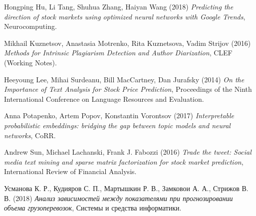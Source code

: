 \documentclass[12pt, twoside]{article}
\begin{document}
\begin{thebibliography}{9}
Hongping Hu, Li Tang, Shuhua Zhang, Haiyan Wang (2018) \emph{Predicting the direction of stock markets using optimized neural networks with Google Trends}, Neurocomputing.

Mikhail Kuznetsov, Anastasia Motrenko, Rita Kuznetsova, Vadim Strijov (2016) \emph{Methods for Intrinsic Plagiarism Detection and Author Diarization}, CLEF (Working Notes).

Heeyoung Lee, Mihai Surdeanu, Bill MacCartney, Dan Jurafsky (2014) \emph{On the Importance of Text Analysis for Stock Price Prediction}, Proceedings of the Ninth International Conference on Language Resources and Evaluation.

Anna Potapenko, Artem Popov, Konstantin Vorontsov (2017) \emph{Interpretable probabilistic embeddings: bridging the gap between topic models and neural networks}, CoRR.

Andrew Sun, Michael Lachanski, Frank J. Fabozzi (2016) \emph{Trade the tweet: Social media text mining and sparse matrix factorization for stock market prediction}, International Review of Financial Analysis.

Усманова К. Р., Кудияров С. П., Мартышкин Р. В., Замковои А. А., Стрижов В. В. (2018) \emph{Анализ зависимостей между показателями при прогнозировании объема грузоперевозок}, Системы и средства информатики.
\end{thebibliography}
\end{document}
